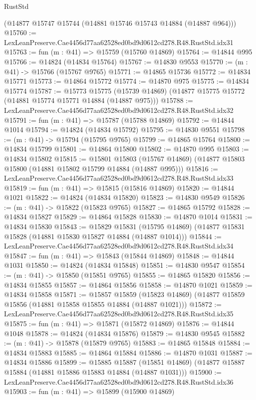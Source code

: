 \begin{lexlean}{RustStd}
\begin{coremodule}
    (@14877 @15747 @15744 (@14881 @15746 @15743 @14884 (@14887 @964)))
@15760 := LexLeanPreserve.Cae4456d77aa62528ed0bd9d0612cd278.R48.RustStd.idx31
@15763 := fun (m : @41) => @15759 (@15760 @14869)
@15764 := @14844 @995
@15766 := @14824 (@14834 @15764)
@15767 := @14830 @9553
@15770 := (m : @41) -> @15766 (@15767 @9765)
@15771 := @14865 @15736
@15772 := @14834 @15771
@15773 := @14864 @15772
@15774 := @14870 @975
@15775 := @14834 @15774
@15787 := @15773
    @15775
    (@15739 @14869)
    (@14877 @15775 @15772 (@14881 @15774 @15771 @14884 (@14887 @975)))
@15788 := LexLeanPreserve.Cae4456d77aa62528ed0bd9d0612cd278.R48.RustStd.idx32
@15791 := fun (m : @41) => @15787 (@15788 @14869)
@15792 := @14844 @1014
@15794 := @14824 (@14834 @15792)
@15795 := @14830 @9551
@15798 := (m : @41) -> @15794 (@15795 @9765)
@15799 := @14865 @15764
@15800 := @14834 @15799
@15801 := @14864 @15800
@15802 := @14870 @995
@15803 := @14834 @15802
@15815 := @15801
    @15803
    (@15767 @14869)
    (@14877 @15803 @15800 (@14881 @15802 @15799 @14884 (@14887 @995)))
@15816 := LexLeanPreserve.Cae4456d77aa62528ed0bd9d0612cd278.R48.RustStd.idx33
@15819 := fun (m : @41) => @15815 (@15816 @14869)
@15820 := @14844 @1021
@15822 := @14824 (@14834 @15820)
@15823 := @14830 @9549
@15826 := (m : @41) -> @15822 (@15823 @9765)
@15827 := @14865 @15792
@15828 := @14834 @15827
@15829 := @14864 @15828
@15830 := @14870 @1014
@15831 := @14834 @15830
@15843 := @15829
    @15831
    (@15795 @14869)
    (@14877 @15831 @15828 (@14881 @15830 @15827 @14884 (@14887 @1014)))
@15844 := LexLeanPreserve.Cae4456d77aa62528ed0bd9d0612cd278.R48.RustStd.idx34
@15847 := fun (m : @41) => @15843 (@15844 @14869)
@15848 := @14844 @1031
@15850 := @14824 (@14834 @15848)
@15851 := @14830 @9547
@15854 := (m : @41) -> @15850 (@15851 @9765)
@15855 := @14865 @15820
@15856 := @14834 @15855
@15857 := @14864 @15856
@15858 := @14870 @1021
@15859 := @14834 @15858
@15871 := @15857
    @15859
    (@15823 @14869)
    (@14877 @15859 @15856 (@14881 @15858 @15855 @14884 (@14887 @1021)))
@15872 := LexLeanPreserve.Cae4456d77aa62528ed0bd9d0612cd278.R48.RustStd.idx35
@15875 := fun (m : @41) => @15871 (@15872 @14869)
@15876 := @14844 @1048
@15878 := @14824 (@14834 @15876)
@15879 := @14830 @9545
@15882 := (m : @41) -> @15878 (@15879 @9765)
@15883 := @14865 @15848
@15884 := @14834 @15883
@15885 := @14864 @15884
@15886 := @14870 @1031
@15887 := @14834 @15886
@15899 := @15885
    @15887
    (@15851 @14869)
    (@14877 @15887 @15884 (@14881 @15886 @15883 @14884 (@14887 @1031)))
@15900 := LexLeanPreserve.Cae4456d77aa62528ed0bd9d0612cd278.R48.RustStd.idx36
@15903 := fun (m : @41) => @15899 (@15900 @14869)

\end{coremodule}
\end{lexlean}
